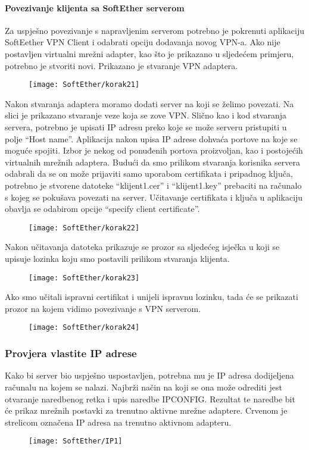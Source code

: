 \newpage
\paragraph*{Povezivanje klijenta sa SoftEther serverom}

\hfill \smallbreak
Za uspješno povezivanje s napravljenim serverom potrebno je pokrenuti aplikaciju SoftEether VPN Client i odabrati opciju dodavanja novog VPN-a. Ako nije postavljen virtualni mrežni adapter, kao što je prikazano u sljedećem primjeru, potrebno je stvoriti novi. Prikazano je stvaranje VPN adaptera.
\begin{figure}[h!]
     \centering
     \texttt{[image: SoftEther/korak21]}
\end{figure}
\FloatBarrier
Nakon stvaranja adaptera moramo dodati server na koji se želimo povezati. Na slici je prikazano stvaranje veze koja se zove VPN. Slično kao i kod stvaranja servera, potrebno je upisati IP adresu preko koje se može serveru pristupiti u polje ``Host name''. Aplikacija nakon upisa IP adrese dohvaća portove na koje se moguće spojiti. Izbor je nekog od ponuđenih portova proizvoljan, kao i postojećih virtualnih mrežnih adaptera. Budući da smo prilikom stvaranja korisnika servera odabrali da se on može prijaviti samo uporabom certifikata i pripadnog ključa, potrebno je stvorene datoteke ``klijent1.cer'' i ``klijent1.key'' prebaciti na računalo s kojeg se pokušava povezati na server. Učitavanje certifikata i ključa u aplikaciju obavlja se odabirom opcije ``specify client certificate''.
\begin{figure}[h!]
     \centering
     \texttt{[image: SoftEther/korak22]}
\end{figure}
\FloatBarrier
Nakon učitavanja datoteka prikazuje se prozor sa sljedećeg isječka u koji se upisuje lozinka koju smo postavili prilikom stvaranja klijenta.
\begin{figure}[h!]
     \centering
     \texttt{[image: SoftEther/korak23]}
\end{figure}
\FloatBarrier
Ako smo učitali ispravni certifikat i unijeli ispravnu lozinku, tada će se prikazati prozor na kojem vidimo povezivanje s VPN serverom.
\begin{figure}[h!]
     \centering
     \texttt{[image: SoftEther/korak24]}
\end{figure}
\FloatBarrier

\FloatBarrier

\subsubsection{Provjera vlastite IP adrese}
\hfill \smallbreak
Kako bi server bio uspješno uspostavljen, potrebna mu je IP adresa dodijeljena računalu na kojem se nalazi. Najbrži način na koji se ona može odrediti jest otvaranje naredbenog retka i upis naredbe IPCONFIG. Rezultat te naredbe bit će prikaz mrežnih postavki za trenutno aktivne mrežne adaptere.
Crvenom je strelicom označena IP adresa na trenutno aktivnom adapteru.
\begin{figure}[h!]
     \centering
     \texttt{[image: SoftEther/IP1]}
\end{figure}
\FloatBarrier

